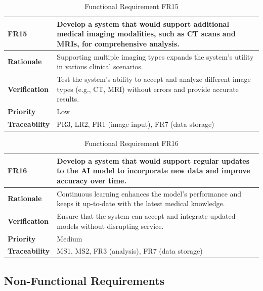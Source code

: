 \documentclass[12pt]{article}
\begin{document}
\begin{table}[h!]
\centering
{}
\begin{tabular}{|p{3.5cm}|p{11.5cm}|}
\hline
\rowcolor{gray!30}
\textbf{FR15} & Develop a system that would support additional medical imaging modalities, such as CT scans and MRIs, for comprehensive analysis. \\
\hline
\textbf{Rationale} & Supporting multiple imaging types expands the system's utility in various clinical scenarios. \\
\hline
\textbf{Verification} & Test the system's ability to accept and analyze different image types (e.g., CT, MRI) without errors and provide accurate results. \\
\hline
\textbf{Priority} & Low \\
\hline
\textbf{Traceability} & PR3, LR2, FR1 (image input), FR7 (data storage) \\
\hline
\end{tabular}
\caption{Functional Requirement FR15}
\end{table}

\begin{table}[h!]
\centering
{}
\begin{tabular}{|p{3.5cm}|p{11.5cm}|}
\hline
\rowcolor{gray!30}
\textbf{FR16} & Develop a system that would support regular updates to the AI model to incorporate new data and improve accuracy over time. \\
\hline
\textbf{Rationale} & Continuous learning enhances the model's performance and keeps it up-to-date with the latest medical knowledge. \\
\hline
\textbf{Verification} & Ensure that the system can accept and integrate updated models without disrupting service. \\
\hline
\textbf{Priority} & Medium \\
\hline
\textbf{Traceability} & MS1, MS2, FR3 (analysis), FR7 (data storage) \\
\hline
\end{tabular}
\caption{Functional Requirement FR16}
\end{table}  
\clearpage                                                                                                                                                    

\subsection{Non-Functional Requirements}
\end{document}
